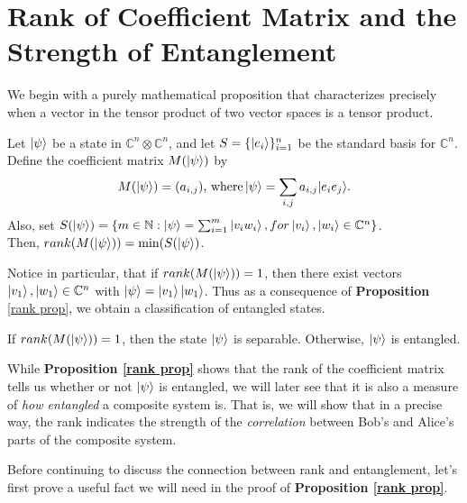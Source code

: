 \pagebreak

\section{Rank of Coefficient Matrix and the Strength of Entanglement}
\label{Section 6.1}

We begin with a purely mathematical proposition that characterizes precisely when a vector in the tensor product of two vector spaces is a tensor product.

\begin{prop}
\label{rank prop}
Let $\ket{\psi}$ be a state in $\mathbb{C}^n \otimes \mathbb{C}^n$, and let $S=\{\ket{e_i}\}_{i=1}^n$ be the standard basis for $\mathbb{C}^n$. Define the coefficient matrix $M(\ket{\psi})$ by
\begin{equation}
M(\ket{\psi})=(a_{i,j}) \textrm{, where}\ket{\psi}=\sum\limits_{i,j}a_{i,j}|e_i e_j\rangle . 
\end{equation}
Also, set $S(\ket{\psi})=\{m\in \mathbb{N}: \ket{\psi}=\sum_{i=1}^m\ket{v_i w_i}, for \ket{v_i}, \ket{w_i} \in \mathbb{C}^n\}$.\\  Then, $rank(M(\ket{\psi}))=\textrm{min} (S(\ket{\psi})$.
\end{prop}

Notice in particular, that if $rank(M(\ket{\psi}))=1$, then there exist vectors $\ket{v_1}, \ket{w_1} \in \mathbb{C}^n$ with $\ket{\psi}=\ket{v_1}\ket{w_1}$.  Thus as a consequence of {\bf{Proposition}} \ref{rank prop}, we obtain a classification of entangled states.
\begin{corollary}
If $rank(M(\ket{\psi}))=1$, then the state $\ket{\psi}$ is separable. Otherwise, $\ket{\psi}$ is entangled.
\end{corollary}

While {\bf{Proposition} \ref{rank prop}} shows that the rank of the coefficient matrix tells us whether or not $\ket{\psi}$ is entangled, we will later see that it is also a measure of {\emph{how entangled}} a composite system is. That is, we will show that in a precise way, the rank indicates the strength of the {\emph{correlation}} between Bob's and Alice's parts of the composite system.

Before continuing to discuss the connection between rank and entanglement, let's first prove a useful fact we will need in the proof of \textbf{Proposition \ref{rank prop}}.

